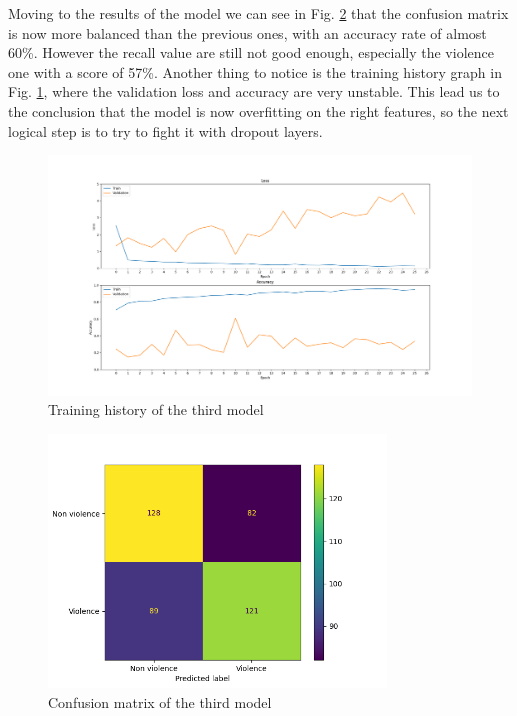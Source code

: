 Moving to the results of the model we can see in Fig. \ref{fig:Third2DCNNMatrix} that the confusion matrix is now more balanced than the previous ones, with an accuracy rate of almost 60\%. However the recall value are still not good enough, especially the violence one with a score of 57\%. Another thing to notice is the training history graph in Fig. \ref{fig:Third2DCNNHistory}, where the validation loss and accuracy are very unstable. This lead us to the conclusion that the model is now overfitting on the right features, so the next logical step is to try to fight it with dropout layers.
\begin{figure}[]
    \centering
    \includegraphics[width=1\textwidth]{images/731a-simple3augConv8_64Dense128_64nozoom-b538-history.png}
    \caption{Training history of the third model}
    \label{fig:Third2DCNNHistory}
\end{figure}
\begin{figure}[]
    \centering
    \includegraphics[width=0.8\textwidth]{images/731a-simple3augConv8_64Dense128_64nozoom-b538-conf_matrix.png}
    \caption{Confusion matrix of the third model}
    \label{fig:Third2DCNNMatrix}
\end{figure}
\pagebreak
